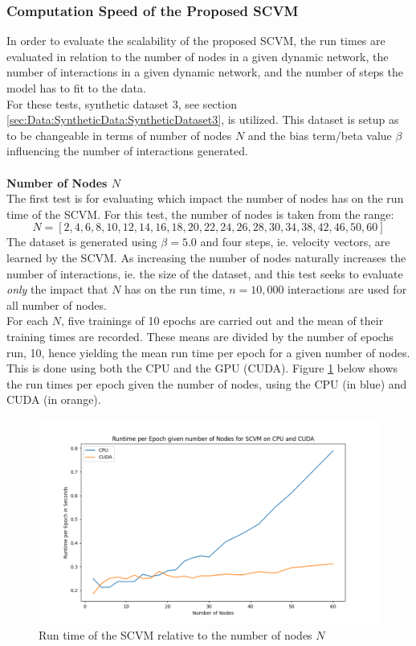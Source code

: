 \subsubsection{Computation Speed of the Proposed SCVM}
\label{sec:ResearchQuestion2:ComputationSpeed}
In order to evaluate the scalability of the proposed SCVM, the run times are evaluated in relation to the number of nodes in a given dynamic network, the number of interactions in a given dynamic network, and the number of steps the model has to fit to the data.
\\
\noindent
For these tests, synthetic dataset 3, see section \ref{sec:Data:SyntheticData:SyntheticDataset3}, is utilized.
This dataset is setup as to be changeable in terms of number of nodes $N$ and the bias term/beta value $\beta$ influencing the number of interactions generated.
\\\\
\textbf{Number of Nodes $N$}
\\
The first test is for evaluating which impact the number of nodes has on the run time of the SCVM.
For this test, the number of nodes is taken from the range:
\begin{equation*}
    N = [2, 4, 6, 8, 10, 12, 14, 16, 18, 20, 22, 24, 26, 28, 30, 34, 38, 42, 46, 50, 60]
\end{equation*}
The dataset is generated using $\beta = 5.0$ and four steps, ie. velocity vectors, are learned by the SCVM.
As increasing the number of nodes naturally increases the number of interactions, ie. the size of the dataset, and this test seeks to evaluate \textit{only} the impact that $N$ has on the run time, $n = 10,000$ interactions are used for all number of nodes.
\\
\noindent
For each $N$, five trainings of 10 epochs are carried out and the mean of their training times are recorded.
These means are divided by the number of epochs run, 10, hence yielding the mean run time per epoch for a given number of nodes.
This is done using both the CPU and the GPU (CUDA).
 Figure \ref{fig:NumNodesRuntimes} below shows the run times per epoch given the number of nodes, using the CPU (in blue) and CUDA (in orange).
\begin{figure}[H]
    \centering
    \includegraphics[width=\textwidth]{0_images/numnodes_runtime2.png}
    \caption{Run time of the SCVM relative to the number of nodes $N$}
    \label{fig:NumNodesRuntimes}
\end{figure}
